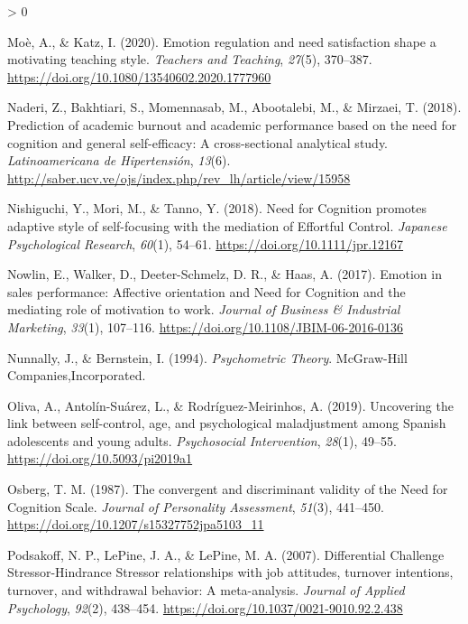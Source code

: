 \documentclass[
  english,
  man,floatsintext]{apa6}
\newlength{\cslhangindent}
\newenvironment{CSLReferences}[2] %
 {%
  \setlength{\parindent}{0pt}
  \ifodd #1 \everypar{\setlength{\hangindent}{\cslhangindent}}\ignorespaces\fi
  \ifnum #2 > 0
  \setlength{\parskip}{#2\baselineskip}
  \fi
 }%
 {}
\begin{document}
\begin{CSLReferences}{1}{0}
\leavevmode\hypertarget{ref-Moe2020}{}%
Moè, A., \& Katz, I. (2020). Emotion regulation and need satisfaction shape a motivating teaching style. \emph{Teachers and Teaching}, \emph{27}(5), 370--387. \url{https://doi.org/10.1080/13540602.2020.1777960}

\leavevmode\hypertarget{ref-Naderi2018}{}%
Naderi, Z., Bakhtiari, S., Momennasab, M., Abootalebi, M., \& Mirzaei, T. (2018). Prediction of academic burnout and academic performance based on the need for cognition and general self-efficacy: {A} cross-sectional analytical study. \emph{Latinoamericana de Hipertensión}, \emph{13}(6). \url{http://saber.ucv.ve/ojs/index.php/rev_lh/article/view/15958}

\leavevmode\hypertarget{ref-Nishiguchi2018}{}%
Nishiguchi, Y., Mori, M., \& Tanno, Y. (2018). Need for {Cognition} promotes adaptive style of self-focusing with the mediation of {Effortful} {Control}. \emph{Japanese Psychological Research}, \emph{60}(1), 54--61. \url{https://doi.org/10.1111/jpr.12167}

\leavevmode\hypertarget{ref-Nowlin2017}{}%
Nowlin, E., Walker, D., Deeter-Schmelz, D. R., \& Haas, A. (2017). Emotion in sales performance: Affective orientation and {Need} for {Cognition} and the mediating role of motivation to work. \emph{Journal of Business \& Industrial Marketing}, \emph{33}(1), 107--116. \url{https://doi.org/10.1108/JBIM-06-2016-0136}

\leavevmode\hypertarget{ref-Nunnally1994}{}%
Nunnally, J., \& Bernstein, I. (1994). \emph{Psychometric {Theory}}. McGraw-Hill Companies,Incorporated.

\leavevmode\hypertarget{ref-Oliva2019}{}%
Oliva, A., Antolín-Suárez, L., \& Rodríguez-Meirinhos, A. (2019). Uncovering the link between self-control, age, and psychological maladjustment among {Spanish} adolescents and young adults. \emph{Psychosocial Intervention}, \emph{28}(1), 49--55. \url{https://doi.org/10.5093/pi2019a1}

\leavevmode\hypertarget{ref-Osberg1987}{}%
Osberg, T. M. (1987). The convergent and discriminant validity of the {Need} for {Cognition} {Scale}. \emph{Journal of Personality Assessment}, \emph{51}(3), 441--450. \url{https://doi.org/10.1207/s15327752jpa5103_11}

\leavevmode\hypertarget{ref-Podsakoff2007}{}%
Podsakoff, N. P., LePine, J. A., \& LePine, M. A. (2007). Differential {Challenge Stressor-Hindrance Stressor} relationships with job attitudes, turnover intentions, turnover, and withdrawal behavior: A meta-analysis. \emph{Journal of Applied Psychology}, \emph{92}(2), 438--454. \url{https://doi.org/10.1037/0021-9010.92.2.438}


\end{CSLReferences}
\end{document}
